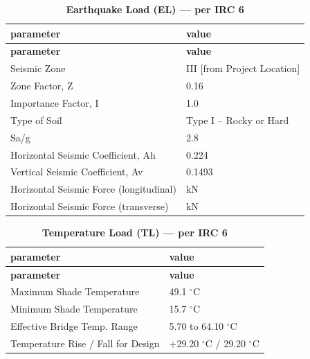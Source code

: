 \documentclass[12pt,a4paper]{report}
\numberwithin{table}{chapter}
\numberwithin{figure}{chapter}
\begin{document}
\vspace{1em}
\begin{longtable}{|L{5.5cm}|p{10.0cm}|}
\caption{\textbf{Earthquake Load (EL) --- per IRC 6}}
\hline
\textbf{parameter} & \textbf{value} \\
\hline

\endfirsthead
\hline
\textbf{parameter} & \textbf{value} \\
\hline
\endhead

\textnormal{Seismic Zone} & III [from Project Location] \\[6pt]
\hline
\textnormal{Zone Factor, Z} & 0.16 \\[6pt]
\hline
\textnormal{Importance Factor, I} & 1.0 \\[6pt]
\hline
\textnormal{Type of Soil} & Type I – Rocky or Hard \\[6pt]
\hline
\textnormal{Sa/g} & 2.8 \\[6pt]
\hline
\textnormal{Horizontal Seismic Coefficient, Ah} & 0.224 \\[6pt]
\hline
\textnormal{Vertical Seismic Coefficient, Av} & 0.1493 \\[6pt]
\hline
\textnormal{Horizontal Seismic Force (longitudinal)} &  kN \\[6pt]
\hline
\textnormal{Horizontal Seismic Force (transverse)} &  kN \\[6pt]
\hline
\end{longtable}

\vspace{1em}
\begin{longtable}{|L{5.5cm}|p{10.0cm}|}
\caption{\textbf{Temperature Load (TL) --- per IRC 6}}
\hline
\textbf{parameter} & \textbf{value} \\
\hline

\endfirsthead
\hline
\textbf{parameter} & \textbf{value} \\
\hline
\endhead

\textnormal{Maximum Shade Temperature} & 49.1 $^\circ$C \\[6pt]
\hline
\textnormal{Minimum Shade Temperature} & 15.7 $^\circ$C \\[6pt]
\hline
\textnormal{Effective Bridge Temp. Range} & 5.70 to 64.10 $^\circ$C \\[6pt]
\hline
\textnormal{Temperature Rise / Fall for Design} & +29.20 $^\circ$C / \textminus{}29.20 $^\circ$C \\[6pt]
\hline
\end{longtable}
\end{document}

